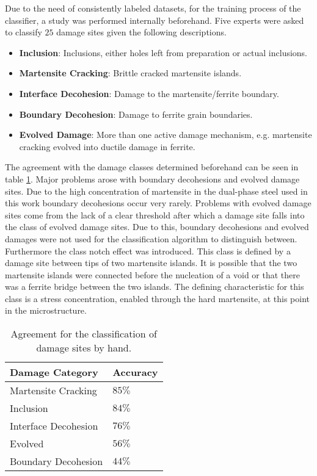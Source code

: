 Due to the need of consistently labeled datasets, for the training process of the classifier, a study was performed internally beforehand. Five experts were asked to classify $25$ damage sites given the following descriptions. 
\begin{itemize}[label={}]
\item \textbf{Inclusion}: Inclusions, either holes left from preparation or actual inclusions.
\item \textbf{Martensite Cracking}: Brittle cracked martensite islands.
\item \textbf{Interface Decohesion}: Damage to the martensite/ferrite boundary.
\item \textbf{Boundary Decohesion}: Damage to ferrite grain boundaries.
\item \textbf{Evolved Damage}: More than one active damage mechanism, e.g. martensite cracking evolved into ductile damage in ferrite.
\end{itemize}
The agreement with the damage classes determined beforehand can be seen in table \ref{tab:Reliability}. Major problems arose with boundary decohesions and evolved damage sites. Due to the high concentration of martensite in the dual-phase steel used in this work boundary decohesions occur very rarely. Problems with evolved damage sites come from the lack of a clear threshold after which a damage site falls into the class of evolved damage sites. Due to this, boundary decohesions and evolved damages were not used for the classification algorithm to distinguish between. Furthermore the class notch effect was introduced. This class is defined by a damage site between tips of two martensite islands. It is possible that the two martensite islands were connected before the nucleation of a void or that there was a ferrite bridge between the two islands. The defining characteristic for this class is a stress concentration, enabled through the hard martensite, at this point in the microstructure.

\begin{table}[H]
 \begin{center}
  \begin{tabular}{@{} *2l @{}} \toprule[2pt]
   Damage Category & Accuracy \\\midrule
   Martensite Cracking & $85 \%$   \\ 
   Inclusion  & $84 \%$ \\ 
   Interface Decohesion  & $76 \% $ \\
   Evolved & $56\%$ \\
   Boundary Decohesion & $44 \%$ \\ \bottomrule[2pt]

  \end{tabular}
 \end{center}
 \caption{Agreement for the classification of damage sites by hand. }
 \label{tab:Reliability}
\end{table}

